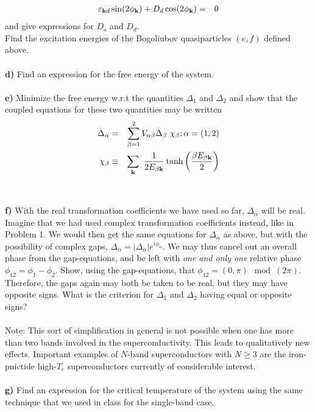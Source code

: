 \begin{problem}
\begin{eqnarray}
		\varepsilon_{{\bf k} d}  \sin(2 \phi_{\bf k}) +    D_d \cos(2 \phi_{\bf k})  & = & 0 \nonumber 
	\end{eqnarray}
	and give expressions for $D_s$ and $D_d$. \\
	Find the excitation energies of the Bogoliubov quasiparticles $(e,f)$ defined above.
	\ \\
	\ \\
	{\bf d)} Find an expression for the free energy of the system.
	\ \\
	\ \\
	{\bf e)} Minimize the free energy w.r.t the quantities $\Delta_1$ and $\Delta_2$ and show that the coupled equations for these two quantities may be written
	\begin{eqnarray}
		\Delta_{\alpha} & = & \sum_{\beta=1}^2 V_{\alpha \beta} \Delta_{\beta} ~ \chi_{\beta};  \alpha = (1,2)  \nonumber \\
		\chi_{\beta} & \equiv & \sum_{\bf k} ~ \frac{1}{2 E_{\beta \bf k} } \tanh \left( \frac{\beta E_{\beta \bf k}}{2} \right) \nonumber
	\end{eqnarray}
	\ \\
	\ \\
	{\bf f)} With the real transformation coefficients we have used so far, $\Delta_\alpha$ will be real. Imagine that we had used complex transformation coefficients instead, like in Problem 1. We would then get the same equations for $\Delta_{\alpha}$ as above, but  with the possibility of complex gaps, $\Delta_{\alpha} = |\Delta_{\alpha}| e^{i \phi_\alpha}$. We may thus cancel out an overall phase from the gap-equations, and be left with {\it one and only one} relative phase $\phi_{12}= \phi_1-\phi_2$. Show, using the gap-equations, that $\phi_{12} = (0,\pi) \mod(2 \pi)$. Therefore, the gaps again may both be taken to be real, but they may have opposite signs. What is the criterion for $\Delta_1$ and $\Delta_2$ having equal or opposite signs?
	\ \\
	\ \\
	Note: This sort of simplification in general is not possible when one has more than two bands involved in the superconductivity. This leads to qualitatively new effects. Important examples of $N$-band superconductors with $N \geq 3$ are the iron-pnictide high-$T_c$ superconductors currently of considerable interest.  
	\ \\
	\ \\
	{\bf g)} Find an expression for the critical temperature of the system using the same technique that we used in class for the single-band case.  
\end{problem}

